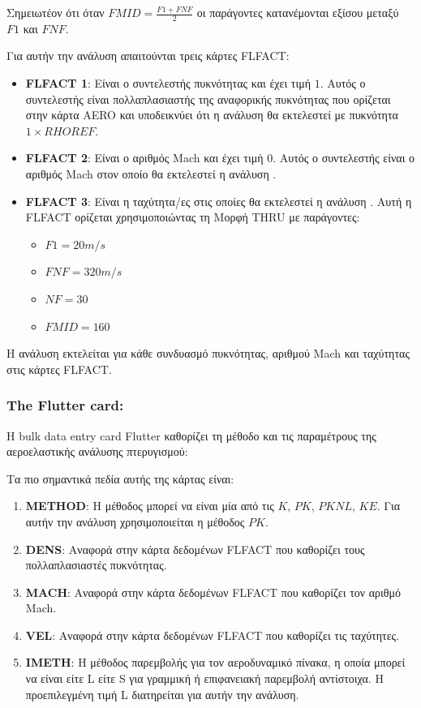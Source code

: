 Σημειωτέον ότι όταν \(FMID = \frac{F1 + FNF}{2}\) οι παράγοντες κατανέμονται εξίσου μεταξύ \(F1\) και \(FNF\).

Για αυτήν την ανάλυση απαιτούνται τρεις κάρτες \textlatin{FLFACT}:

\begin{itemize}
\item
  \textlatin{\textbf{FLFACT 1}}: Είναι ο συντελεστής πυκνότητας και έχει τιμή \(1\). Αυτός ο συντελεστής είναι πολλαπλασιαστής της αναφορικής πυκνότητας που ορίζεται στην κάρτα \textlatin{AERO} και υποδεικνύει ότι η ανάλυση θα εκτελεστεί με πυκνότητα \(1 \times RHOREF\).
\item
  \textlatin{\textbf{FLFACT 2}}: Είναι ο αριθμός \textlatin{Mach} και έχει τιμή \(0\). Αυτός ο συντελεστής είναι ο αριθμός \textlatin{Mach} στον οποίο θα εκτελεστεί η ανάλυση .
\item
  \textlatin{\textbf{FLFACT 3}}: Είναι η ταχύτητα/ες στις οποίες θα εκτελεστεί η ανάλυση . Αυτή η \textlatin{FLFACT} ορίζεται χρησιμοποιώντας τη Μορφή \textlatin{THRU} με παράγοντες:

  \begin{itemize}
  \item
    \(F1 = 20m/s\)
  \item
    \(FNF = 320m/s\)
  \item
    \(NF = 30\)
  \item
    \(FMID = 160\)
  \end{itemize}
\end{itemize}

Η ανάλυση εκτελείται για κάθε συνδυασμό πυκνότητας, αριθμού \textlatin{Mach} και ταχύτητας στις κάρτες \textlatin{FLFACT}.

\subsubsection{\textlatin{The Flutter card:}}

Η \textlatin{bulk data entry card Flutter}  καθορίζει τη μέθοδο και τις παραμέτρους της αεροελαστικής ανάλυσης πτερυγισμού:

Τα πιο σημαντικά πεδία αυτής της κάρτας είναι:

\begin{enumerate}
\def\labelenumi{\arabic{enumi}.}
\item
\textlatin{\textbf{METHOD}}: Η μέθοδος μπορεί να είναι μία από τις $K$, $PK$, $PKNL$, $KE$. Για αυτήν την ανάλυση χρησιμοποιείται η μέθοδος $PK$.
\item
\textlatin{\textbf{DENS}}: Αναφορά στην κάρτα δεδομένων \textlatin{FLFACT} που καθορίζει τους πολλαπλασιαστές πυκνότητας.
\item
\textlatin{\textbf{MACH}}: Αναφορά στην κάρτα δεδομένων \textlatin{FLFACT} που καθορίζει τον αριθμό \textlatin{Mach}.
\item
\textlatin{\textbf{VEL}}: Αναφορά στην κάρτα δεδομένων \textlatin{FLFACT} που καθορίζει τις ταχύτητες.
\item
\textlatin{\textbf{IMETH}}: Η μέθοδος παρεμβολής για τον αεροδυναμικό πίνακα, η οποία μπορεί να είναι είτε L είτε S για γραμμική ή επιφανειακή παρεμβολή αντίστοιχα. Η προεπιλεγμένη τιμή L διατηρείται για αυτήν την ανάλυση.
\end{enumerate}

